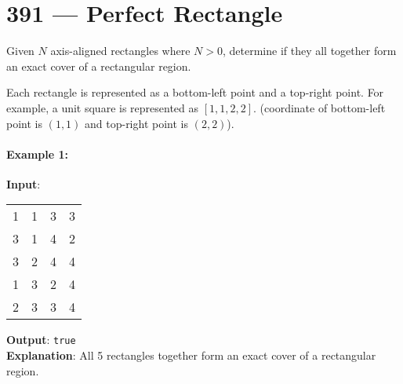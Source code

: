\section{391 --- Perfect Rectangle}
Given $N$ axis-aligned rectangles where $N > 0$, determine if they all together form an exact cover of a rectangular region.
\par
Each rectangle is represented as a bottom-left point and a top-right point. For example, a unit square is represented as $[1,1,2,2]$. (coordinate of bottom-left point is $(1, 1)$ and top-right point is $(2, 2)$).

\paragraph{Example 1:}
\begin{flushleft}
\textbf{Input}:
\begin{table}[H]
\begin{tabular}{cccc}
1 & 1 & 3 & 3\\
3 & 1 & 4 & 2\\
3 & 2 & 4 & 4\\
1 & 3 & 2 & 4\\
2 & 3 & 3 & 4
\end{tabular}
\end{table}
\textbf{Output}: \texttt{true}
\\
\textbf{Explanation}: All 5 rectangles together form an exact cover of a rectangular region.


\begin{figure}[H]
\end{figure}

\end{flushleft}

